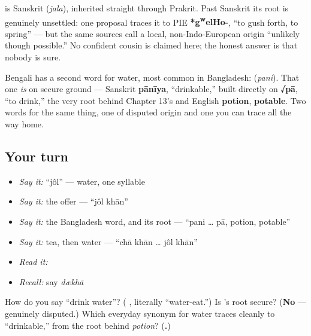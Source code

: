 \begin{cousinweb}
\textbf{} is Sanskrit \textbf{} (\emph{jala}), inherited straight through Prakrit. Past Sanskrit its root is genuinely unsettled: one proposal traces it to PIE \textbf{*g\textsuperscript{w}elHo-}, \textquotedblleft{}to gush forth, to spring\textquotedblright{} — but the same sources call a local, non-Indo-European origin \textquotedblleft{}unlikely though possible.\textquotedblright{} No confident cousin is claimed here; the honest answer is that nobody is sure.

Bengali has a second word for water, most common in Bangladesh: \textbf{} (\emph{pani}). That one \emph{is} on secure ground — Sanskrit \textbf{pānīya}, \textquotedblleft{}drinkable,\textquotedblright{} built directly on \textbf{√pā}, \textquotedblleft{}to drink,\textquotedblright{} the very root behind Chapter 13's \textbf{ } and English \textbf{potion}, \textbf{potable}. Two words for the same thing, one of disputed origin and one you can trace all the way home.
\end{cousinweb}

\subsection*{Your turn}
\begin{itemize}
\raggedright
  \item \emph{Say it:} \textquotedblleft{}jôl\textquotedblright{} — water, one syllable
  \item \emph{Say it:} the offer — \textquotedblleft{}jôl khān\textquotedblright{}
  \item \emph{Say it:} the Bangladesh word, and its root — \textquotedblleft{}pani … pā, potion, potable\textquotedblright{}
  \item \emph{Say it:} tea, then water — \textquotedblleft{}chā khān … jôl khān\textquotedblright{}
  \item \emph{Read it:} \textbf{}
  \item \emph{Recall:} say \emph{dækhā}
\end{itemize}

\begin{tcolorbox}[breakable,colback=teal!4,colframe=teal!35!black,title={Before you move on}]
How do you say \textquotedblleft{}drink water\textquotedblright{}? (\textbf{ }, literally \textquotedblleft{}water-eat.\textquotedblright{}) Is 's root secure? (\textbf{No} — genuinely disputed.) Which everyday synonym for water traces cleanly to \textquotedblleft{}drinkable,\textquotedblright{} from the root behind \emph{potion}? (\textbf{.})
\end{tcolorbox}
